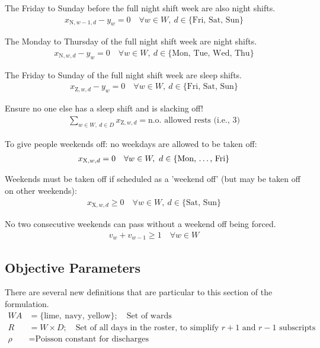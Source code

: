 \documentclass[a4paper]{article}
\begin{document}
The Friday to Sunday before the full night shift week are also night shifts.
\begin{align}
  x_{\text{N}, w-1, d} - y_w = 0 \quad\forall w\in W,\ d\in \{\text{Fri, Sat, Sun}\}
\end{align}

The Monday to Thursday of the full night shift week are night shifts.
\begin{align}
  x_{\text{N}, w, d} - y_w = 0 \quad\forall w\in W,\ d\in \{\text{Mon, Tue, Wed, Thu}\}
\end{align}

The Friday to Sunday of the full night shift week are sleep shifts.
\begin{align}
  x_{\text{Z}, w, d} - y_w = 0 \quad\forall w\in W,\ d\in \{\text{Fri, Sat, Sun}\}
\end{align}

Ensure no one else has a sleep shift and is slacking off!
\begin{align}
  \sum_{w\in W,\ d\in D} x_{\text{Z}, w, d} = \text{n.o. allowed rests (i.e., 3)}
\end{align}

To give people weekends off: no weekdays are allowed to be taken off:
\begin{align}
  x_{\text{X}, w, d} = 0 \quad\forall w\in W,\ d\in \{\text{Mon, \dots, Fri}\}
\end{align}

Weekends must be taken off if scheduled as a 'weekend off' (but may be taken off on other weekends):
\begin{align}
  x_{\text{X}, w, d} \ge 0 \quad\forall w\in W,\ d\in \{\text{Sat, Sun}\}
\end{align}

No two consecutive weekends can pass without a weekend off being forced.
\begin{align}
  v_w + v_{w-1} \ge 1 \quad\forall w\in W
\end{align}

\subsection{Objective Parameters}

There are several new definitions that are particular to this section of the formulation.
\begin{align*}
  WA &= \{\text{lime},\ \text{navy},\ \text{yellow}\};\quad\text{Set of wards}\\
  R &= W\times D;\quad\text{Set of all days in the roster, to simplify $r+1$ and $r-1$ subscripts}\\
  \rho &= \text{Poisson constant for discharges}
\end{align*}
\end{document}
